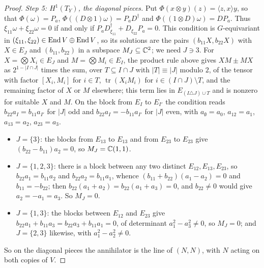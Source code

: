 \begin{proof}
\emph{Step 5: $H^{1}(T_{Y})$, the diagonal pieces.} Put
$\Phi(x\otimes y)(z)=\langle z,x\rangle y$, so that $\Phi(\omega)=P_{a}$,
$\Phi((D\otimes1)\omega)=P_{a}D^{\dagger}$ and $\Phi((1\otimes D)\omega)=
DP_{a}$. Thus $\xi_{11}\omega+\xi_{22}\omega=0$ if and only if
$P_{a}D_{\xi_{11}}^{\dagger}+D_{\xi_{22}}P_{a}=0$. This condition is
$G$-equivariant in $(\xi_{11},\xi_{22})\in\operatorname{End} V\oplus\operatorname{End} V$, so its solutions
are the pairs $(b_{11}X,b_{22}X)$ with $X\in E_{J}$ and $(b_{11},b_{22})$ in a
subspace $M_{J}\subseteq\mathbb{C}^{2}$; we need $J\ni3$. For $X=\bigotimes X_{i}\in
E_{J}$ and $M=\bigotimes M_{i}\in E_{I}$, the product rule above gives
$XM\pm MX$ as $2^{1-|I\cap J|}$ times the sum, over $T\subseteq I\cap J$ with
$|T|\equiv|J|$ modulo $2$, of the tensor with factor $[X_{i},M_{i}]$ for
$i\in T$, $\operatorname{tr}(X_{i}M_{i})$ for $i\in(I\cap J)\setminus T$, and
the remaining factor of $X$ or $M$ elsewhere; this term lies in
$E_{(I\triangle J)\cup T}$ and is nonzero for suitable $X$ and $M$. On the
block from $E_{I}$ to $E_{I'}$ the condition reads $b_{22}a_{I}=b_{11}a_{I'}$
for $|J|$ odd and $b_{22}a_{I}=-b_{11}a_{I'}$ for $|J|$ even, with
$a_{\emptyset}=a_{0}$, $a_{12}=a_{1}$, $a_{13}=a_{2}$, $a_{23}=a_{3}$.
\begin{itemize}[leftmargin=1.6em,itemsep=1pt]
\item $J=\{3\}$: the blocks from $E_{13}$ to $E_{13}$ and from $E_{23}$ to
  $E_{23}$ give $(b_{22}-b_{11})a_{2}=0$, so $M_{J}=\mathbb{C}(1,1)$.
\item $J=\{1,2,3\}$: there is a block between any two distinct
  $E_{12},E_{13},E_{23}$, so $b_{22}a_{1}=b_{11}a_{2}$ and
  $b_{22}a_{2}=b_{11}a_{1}$, whence $(b_{11}+b_{22})(a_{1}-a_{2})=0$ and
  $b_{11}=-b_{22}$; then $b_{22}(a_{1}+a_{2})=b_{22}(a_{1}+a_{3})=0$, and
  $b_{22}\ne0$ would give $a_{2}=-a_{1}=a_{3}$. So $M_{J}=0$.
\item $J=\{1,3\}$: the blocks between $E_{12}$ and $E_{23}$ give
  $b_{22}a_{1}+b_{11}a_{3}=b_{22}a_{3}+b_{11}a_{1}=0$, of determinant
  $a_{1}^{2}-a_{3}^{2}\ne0$, so $M_{J}=0$; and $J=\{2,3\}$ likewise, with
  $a_{1}^{2}-a_{2}^{2}\ne0$.
\end{itemize}
So on the diagonal pieces the annihilator is the line of $(N,N)$, with $N$
acting on both copies of $V$.


\end{proof}
